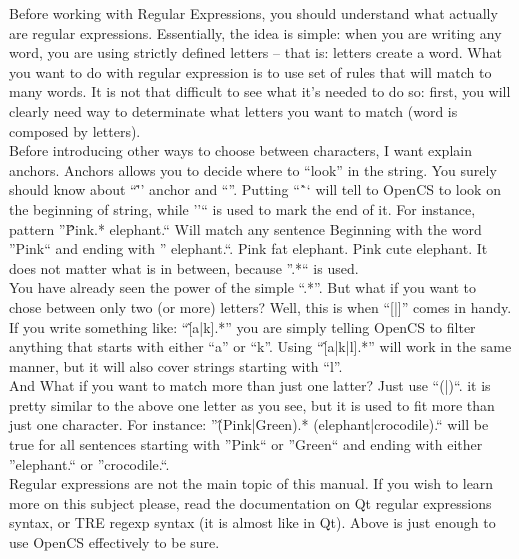 Before working with Regular Expressions, you should understand what actually are regular expressions. Essentially, the idea is simple: when you are writing any word, you are using strictly defined letters -- that is: letters create a word. What you want to do with regular expression is to use set of rules that will match to many words. It is not that difficult to see what it's needed to do so: first, you will clearly need way to determinate what letters you want to match (word is composed by letters).\\

Before introducing other ways to choose between characters, I want explain anchors. Anchors allows you to decide where to ``look'' in the string. You surely should know about ``\^'' anchor and ``\textdollar''. Putting ``\^`` will tell to Open{CS} to look on the beginning of string, while ''\textdollar`` is used to mark the end of it. For instance, pattern ''\^Pink.* elephant.\textdollar`` Will match any sentence Beginning with the word ''Pink`` and ending with '' elephant.``. Pink fat elephant. Pink cute elephant. It does not matter what is in between, because ''.*`` is used.\\

You have already seen the power of the simple ``.*''. But what if you want to chose between only two (or more) letters? Well, this is when ``[|]'' comes in handy. If you write something like: ``\^[a|k].*'' you are simply telling Open{CS} to filter anything that starts with either ``a'' or ``k''. Using ``\^[a|k|l].*'' will work in the same manner, but it will also cover strings starting with ``l''.\\

And What if you want to match more than just one latter? Just use ``(|)``. it is pretty similar to the above one letter as you see, but it is used to fit more than just one character. For instance: ''\^(Pink|Green).* (elephant|crocodile).\textdollar`` will be true for all sentences starting with ''Pink`` or ''Green`` and ending with either ''elephant.`` or ''crocodile.``.\\

Regular expressions are not the main topic of this manual. If you wish to learn more on this subject please, read the documentation on Qt regular expressions syntax, or TRE regexp syntax (it is almost like in Qt). Above is just enough to use Open{CS} effectively to be sure.\\

